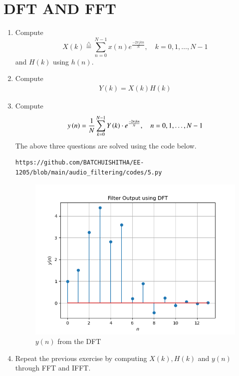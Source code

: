 \documentclass[journal,12pt,twocolumn]{IEEEtran}
\newcommand{\define}{\stackrel{\triangle}{=}}
\theoremstyle{remark}
\begin{document}
\section{DFT AND FFT}
\begin{enumerate}[label=\thesection.\arabic*]
\item Compute
\begin{equation}
X(k) \define \sum _{n=0}^{N-1}x(n) e^{\frac{-2\pi jkn}{N}}, \quad k = 0,1,\dots, N-1
\end{equation}
and $H(k)$ using $h(n)$.
\item Compute 
\begin{align}
Y(k) = X(k)H(k) \label{eq:5.2.1}
\end{align}
\item Compute
\begin{align}
y\left(n\right)={\frac {1}{N}}\sum _{k=0}^{N-1}Y\left(k\right)\cdot e^{\frac{-2\pi jkn}{N}} ,\quad n = 0,1,\dots, N-1\label{eq:5.3.1}
\end{align}
\solution The above three questions are solved using the code below.\\
\begin{lstlisting}
https://github.com/BATCHUISHITHA/EE-1205/blob/main/audio_filtering/codes/5.py
\end{lstlisting}
\begin{figure}[ht]
	\centering
	\includegraphics[width=\columnwidth]{figs/5.png}
	\caption{$y(n)$ from the DFT}
	\label{fig:5}
\end{figure}
\item Repeat the previous exercise by computing $X(k), H(k)$ and $y(n)$ through FFT and IFFT.\\

\end{enumerate}
\end{document}
